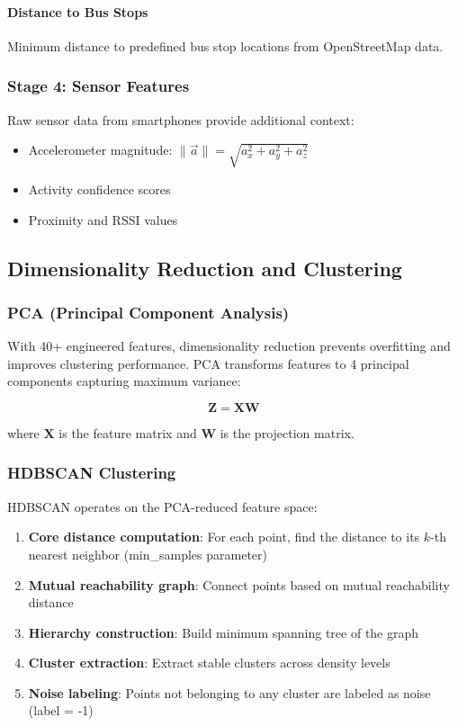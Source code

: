 \paragraph{Distance to Bus Stops}
Minimum distance to predefined bus stop locations from OpenStreetMap data.

\subsubsection{Stage 4: Sensor Features}
Raw sensor data from smartphones provide additional context:
\begin{itemize}
    \item Accelerometer magnitude: $\|\vec{a}\| = \sqrt{a_x^2 + a_y^2 + a_z^2}$
    \item Activity confidence scores
    \item Proximity and RSSI values
\end{itemize}

\subsection{Dimensionality Reduction and Clustering}

\subsubsection{PCA (Principal Component Analysis)}
With 40+ engineered features, dimensionality reduction prevents overfitting and improves clustering performance. PCA transforms features to 4 principal components capturing maximum variance:

\begin{equation}
    \mathbf{Z} = \mathbf{X} \mathbf{W}
\end{equation}

where $\mathbf{X}$ is the feature matrix and $\mathbf{W}$ is the projection matrix.

\subsubsection{HDBSCAN Clustering}
HDBSCAN operates on the PCA-reduced feature space:

\begin{enumerate}
    \item \textbf{Core distance computation}: For each point, find the distance to its $k$-th nearest neighbor (min\_samples parameter)
    \item \textbf{Mutual reachability graph}: Connect points based on mutual reachability distance
    \item \textbf{Hierarchy construction}: Build minimum spanning tree of the graph
    \item \textbf{Cluster extraction}: Extract stable clusters across density levels
    \item \textbf{Noise labeling}: Points not belonging to any cluster are labeled as noise (label = -1)
\end{enumerate}


